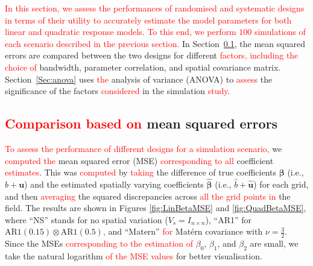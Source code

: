 \documentclass[a4paper]{article} 	%
\newcommand{\Matern}{Mat\'ern }
\newcommand{\AR}{\mathrm{AR1}}
\newcommand{\revision}[1]{\textcolor{red}{#1}}
\begin{document}
\revision{In this section, we assess the performances of randomised and systematic designs in terms of their utility to accurately estimate the model parameters for both linear and quadratic response models. To this end, we perform $100$ simulations of each scenario described in the previous section.} In Section~\ref{Sec:MSE}, the mean squared errors are compared between the two designs for different \revision{factors, including the choice of} bandwidth, parameter correlation, and spatial covariance matrix. Section~\ref{Sec:anova} uses \revision{the} analysis of variance (ANOVA) to  \revision{assess} the significance of the factors \revision{considered} in the simulation \revision{study}. %


\subsection{\revision{Comparison based on} mean squared errors}\label{Sec:MSE}

\revision{To assess the performance of different designs for a simulation scenario,} we \revision{computed the} mean squared error (MSE) \revision{corresponding to all} coefficient \revision{estimates}. This was \revision{computed} by \revision{taking} the difference of true coefficients $\bm{\beta}$ (i.e., $b + \bm{u}$) and the estimated spatially varying coefficients $\bm{\hat{\beta}}$ (i.e., $\hat{b} + \bm{\hat{u}}$) for each grid, and then \revision{averaging} the squared discrepancies across \revision{all the grid points in} the field. The results are shown in Figures \ref{fig:LinBetaMSE} and \ref{fig:QuadBetaMSE}, where ``NS'' stands for no spatial variation ($V_s=I_{n\times n}$), ``AR1'' for $\AR(0.15)\otimes \AR(0.5)$\revision{,} and ``Matern'' \revision{for} \Matern covariance with $\nu=\frac{3}{2}$. Since the MSEs \revision{corresponding to the estimation of} $\beta_0$, $\beta_1$, and $\beta_2$ are small, we take the natural logarithm \revision{of the MSE values} for better visualisation. 
\end{document}
